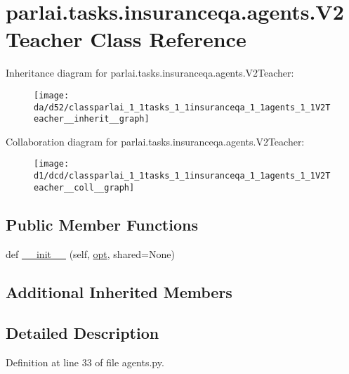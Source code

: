 \hypertarget{classparlai_1_1tasks_1_1insuranceqa_1_1agents_1_1V2Teacher}{}\section{parlai.\+tasks.\+insuranceqa.\+agents.\+V2\+Teacher Class Reference}
\label{classparlai_1_1tasks_1_1insuranceqa_1_1agents_1_1V2Teacher}


Inheritance diagram for parlai.\+tasks.\+insuranceqa.\+agents.\+V2\+Teacher\+:\nopagebreak
\begin{figure}[H]
\begin{center}
\leavevmode
\texttt{[image: da/d52/classparlai\_1\_1tasks\_1\_1insuranceqa\_1\_1agents\_1\_1V2Teacher\_\_inherit\_\_graph]}
\end{center}
\end{figure}


Collaboration diagram for parlai.\+tasks.\+insuranceqa.\+agents.\+V2\+Teacher\+:\nopagebreak
\begin{figure}[H]
\begin{center}
\leavevmode
\texttt{[image: d1/dcd/classparlai\_1\_1tasks\_1\_1insuranceqa\_1\_1agents\_1\_1V2Teacher\_\_coll\_\_graph]}
\end{center}
\end{figure}
\subsection*{Public Member Functions}
\begin{DoxyCompactItemize}
\item 
def \hyperlink{classparlai_1_1tasks_1_1insuranceqa_1_1agents_1_1V2Teacher_aff5c049cb85ce4a1af8304373c908975}{\+\_\+\+\_\+init\+\_\+\+\_\+} (self, \hyperlink{classparlai_1_1core_1_1teachers_1_1FbDialogTeacher_af7a9ec497b9cd0292d7b8fa220da7c28}{opt}, shared=None)
\end{DoxyCompactItemize}
\subsection*{Additional Inherited Members}


\subsection{Detailed Description}


Definition at line 33 of file agents.\+py.



